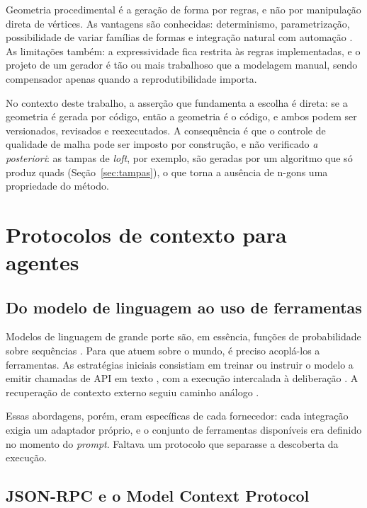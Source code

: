 Geometria procedimental \'e a gera\c{c}\~ao de forma por regras, e n\~ao por manipula\c{c}\~ao
direta de v\'ertices. As vantagens s\~ao conhecidas: determinismo, parametriza\c{c}\~ao,
possibilidade de variar fam\'ilias de formas e integra\c{c}\~ao natural com automa\c{c}\~ao
\cite{mortenson1997}. As limita\c{c}\~oes tamb\'em: a expressividade fica restrita \`as regras
implementadas, e o projeto de um gerador \'e t\~ao ou mais trabalhoso que a modelagem manual,
sendo compensador apenas quando a reprodutibilidade importa.

No contexto deste trabalho, a asser\c{c}\~ao que fundamenta a escolha \'e direta: se a
geometria \'e gerada por c\'odigo, ent\~ao a geometria \'e o c\'odigo, e ambos podem ser
versionados, revisados e reexecutados. A consequ\^encia \'e que o controle de qualidade de malha
pode ser imposto por constru\c{c}\~ao, e n\~ao verificado \emph{a posteriori}: as tampas de
\emph{loft}, por exemplo, s\~ao geradas por um algoritmo que s\'o produz quads
(Se\c{c}\~ao~\ref{sec:tampas}), o que torna a aus\^encia de n-gons uma propriedade do m\'etodo.

\section{Protocolos de contexto para agentes}

\subsection{Do modelo de linguagem ao uso de ferramentas}

Modelos de linguagem de grande porte s\~ao, em ess\^encia, fun\c{c}\~oes de probabilidade sobre
sequ\^encias \cite{vaswani2017, brown2020}. Para que atuem sobre o mundo, \'e preciso
acopl\'a-los a ferramentas. As estrat\'egias iniciais consistiam em treinar ou instruir o modelo
a emitir chamadas de API em texto \cite{schick2023, patil2023}, com a execu\c{c}\~ao
intercalada \`a delibera\c{c}\~ao \cite{yao2023, wei2022}. A recupera\c{c}\~ao de contexto
externo seguiu caminho an\'alogo \cite{lewis2020}.

Essas abordagens, por\'em, eram espec\'ificas de cada fornecedor: cada integra\c{c}\~ao exigia
um adaptador pr\'oprio, e o conjunto de ferramentas dispon\'iveis era definido no momento do
\emph{prompt}. Faltava um protocolo que separasse a descoberta da execu\c{c}\~ao.

\subsection{JSON-RPC e o Model Context Protocol}

